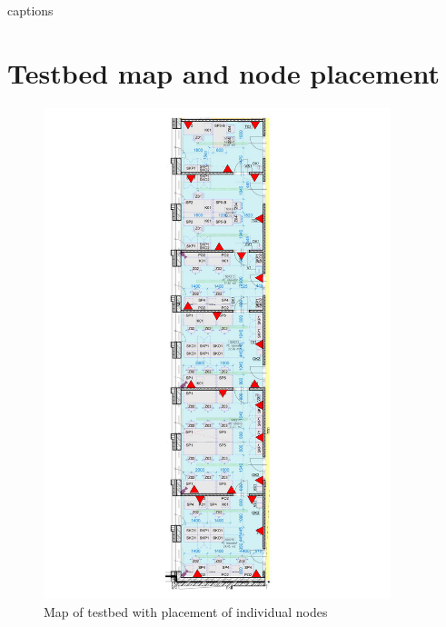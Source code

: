 \documentclass[
  print, %
  Table,   %
  nolof,     %
  nolot,     %
           oneside
]{fithesis3}
\begin{document}
{\csname captions\languagename\endcsname %
\makeatletter %
  \thesis@selectLocale{\thesis@locale}\makeatother
\printbibliography[heading=bibintoc]} %

\appendix %
\chapter{Testbed map and node placement}
\begin{figure}[h!!!]
  \includegraphics[width=0.9\textwidth]{../images/testbed.png}
\caption{Map of testbed with placement of individual nodes}
\label{fig:map}
\end{figure}
\end{document}
